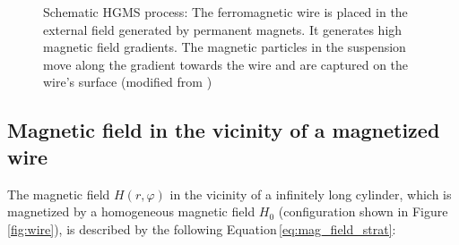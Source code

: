 
\begin{figure}[H]
\centering

\caption[Schematic HGMS process]{Schematic HGMS process: The ferromagnetic wire is placed in the external field generated by permanent magnets. It generates high magnetic field gradients. The magnetic particles in the suspension move along the gradient towards the wire and are captured on the wire's surface (modified from \cite{FranzrebHabil}) 
\label{fig:hgms}
}
\end{figure} 

\subsection{Magnetic field in the vicinity of a magnetized wire}
\label{subsec:mag_field}
The magnetic field $H(r,\varphi)$ in the vicinity of a infinitely long cylinder, which is magnetized by a homogeneous magnetic field $H_{0}$ (configuration shown in Figure\,\ref{fig:wire}), is described by the following Equation\,\ref{eq:mag_field_strat}:

